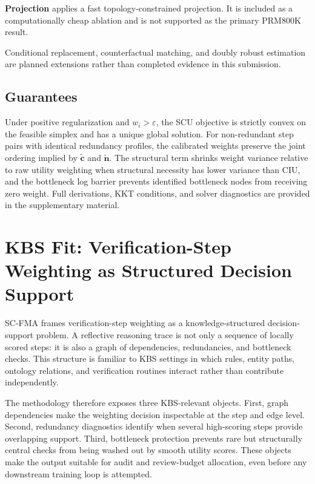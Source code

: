 \documentclass[a4paper,fleqn]{cas-sc}
\begin{document}
\textbf{Projection} applies a fast topology-constrained projection. It is included as a computationally cheap ablation and is not supported as the primary PRM800K result.

Conditional replacement, counterfactual matching, and doubly robust estimation are planned extensions rather than completed evidence in this submission.

\subsection{Guarantees}

Under positive regularization and $w_i>\varepsilon$, the SCU objective is strictly convex on the feasible simplex and has a unique global solution. For non-redundant step pairs with identical redundancy profiles, the calibrated weights preserve the joint ordering implied by $\tilde{\mathbf{c}}$ and $\tilde{\mathbf{n}}$. The structural term shrinks weight variance relative to raw utility weighting when structural necessity has lower variance than CIU, and the bottleneck log barrier prevents identified bottleneck nodes from receiving zero weight. Full derivations, KKT conditions, and solver diagnostics are provided in the supplementary material.

\section{KBS Fit: Verification-Step Weighting as Structured Decision Support}
\label{sec:kbs-fit}

SC-FMA frames verification-step weighting as a knowledge-structured decision-support problem. A reflective reasoning trace is not only a sequence of locally scored steps: it is also a graph of dependencies, redundancies, and bottleneck checks. This structure is familiar to KBS settings in which rules, entity paths, ontology relations, and verification routines interact rather than contribute independently.

The methodology therefore exposes three KBS-relevant objects. First, graph dependencies make the weighting decision inspectable at the step and edge level. Second, redundancy diagnostics identify when several high-scoring steps provide overlapping support. Third, bottleneck protection prevents rare but structurally central checks from being washed out by smooth utility scores. These objects make the output suitable for audit and review-budget allocation, even before any downstream training loop is attempted.
\end{document}
